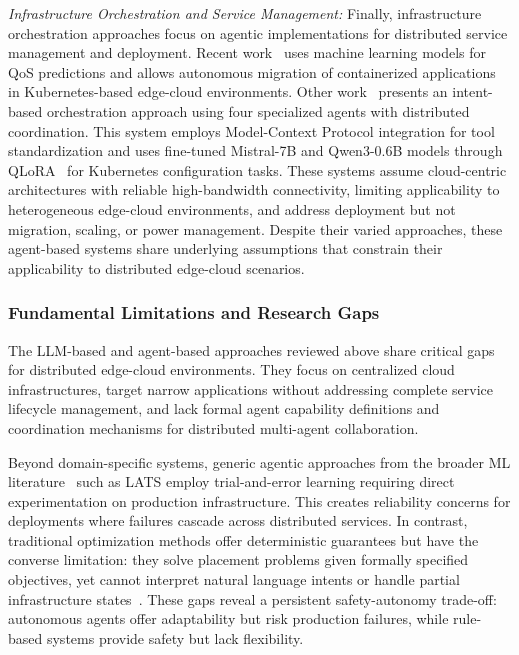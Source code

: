 \textit{Infrastructure Orchestration and Service Management:} Finally, infrastructure orchestration approaches focus on agentic implementations for distributed service management and deployment. Recent work~\cite{DataConnectorAgentFramework2024} uses machine learning models for \ac{QoS} predictions and allows autonomous migration of containerized applications in Kubernetes-based edge-cloud environments. Other work~\cite{service_orch_2025} presents an intent-based orchestration approach using four specialized agents with distributed coordination. This system employs Model-Context Protocol integration for tool standardization and uses fine-tuned Mistral-7B and Qwen3-0.6B models through \ac{QLoRA}~\cite{dettmers2023qlora} for Kubernetes configuration tasks. These systems assume cloud-centric architectures with reliable high-bandwidth connectivity, limiting applicability to heterogeneous edge-cloud environments, and address deployment but not migration, scaling, or power management. Despite their varied approaches, these agent-based systems share underlying assumptions that constrain their applicability to distributed edge-cloud scenarios.

\subsubsection{Fundamental Limitations and Research Gaps}

The \ac{LLM}-based and agent-based approaches reviewed above share critical gaps for distributed edge-cloud environments. They focus on centralized cloud infrastructures, target narrow applications without addressing complete service lifecycle management, and lack formal agent capability definitions and coordination mechanisms for distributed multi-agent collaboration.

Beyond domain-specific systems, generic agentic approaches from the broader \ac{ML} literature~\cite{yao2023react, LATS} such as \ac{LATS} employ trial-and-error learning requiring direct experimentation on production infrastructure. This creates reliability concerns for deployments where failures cascade across distributed services. In contrast, traditional optimization methods offer deterministic guarantees but have the converse limitation: they solve placement problems given formally specified objectives, yet cannot interpret natural language intents or handle partial infrastructure states~\cite{6g_struggles_orchestration2025}. These gaps reveal a persistent safety-autonomy trade-off: autonomous agents offer adaptability but risk production failures, while rule-based systems provide safety but lack flexibility.

